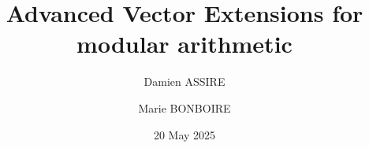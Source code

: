 \usepackage{graphicx} %
\usepackage{amssymb}
\usepackage{amsmath}
\usepackage{amsthm}
\usepackage{hyperref}



\beamertemplatenavigationsymbolsempty


\title[PCCA]{\textbf{Advanced Vector Extensions for modular arithmetic}}
\date{20 May 2025}
\author[D.ASSIRE, M.BONBOIRE]
{Damien ASSIRE \and Marie BONBOIRE}

